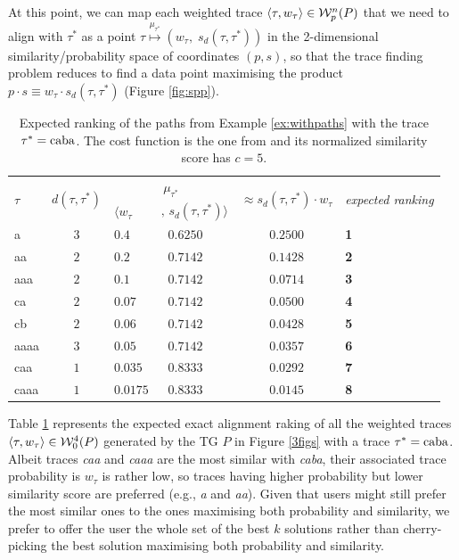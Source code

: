 At this point, we can map each weighted trace  $\braket{\tau,w_\tau}\in\mathcal{W}_p^n(P)$ that we need to align with $\tau^*$ as a point $\tau\overset{\mu_{\tau^*}}{\mapsto}(w_\tau,\; s_d(\tau,\tau^*))$ in the 2-dimensional similarity/probability space of coordinates $(p,s)$, so that the trace finding problem reduces to find a data point maximising the product $p\cdot s\equiv w_\tau\cdot s_d(\tau,\tau^*)$ (Figure \ref{fig:spp}).

\begin{table}[!t]
\centering
\caption{Expected ranking of the paths from Example \ref{ex:withpaths} with the trace $\tau^*=\textup{caba}$. The cost function is the one from \cite{LeoniM17} and its normalized similarity score has $c=5$.}\label{tab:expected}
\begin{tabular}{lc|ll|cl}
	\toprule
	
	\multirow{2}{*}{$\tau$} & 
	\multirow{2}{*}{$d(\tau,\tau^*)$} & 
	\multicolumn{2}{c|}{$\mu_{\tau^*}$} &
	 \multirow{2}{*}{$\approx s_d(\tau,\tau^*)\cdot w_\tau$} & \multirow{2}{*}{\textit{expected ranking}}\\
	 
	\cline{3-4} &&  $\langle w_\tau$ &  $,\,s_d(\tau,\tau^*)\rangle $ &&\\
	 
	\midrule
	{a}  & $3$ & $0.4$ & $\;\; 0.6250$  & $0.2500$ & \textbf{1}\\
	{aa}  & $2$ & $0.2$ & $\;\; 0.7142$ & $0.1428$ & \textbf{2}\\
	{aaa}  & $2$ & $0.1$ & $\;\; 0.7142$ & $0.0714$ & \textbf{3}\\
	{ca}  & $2$ & $0.07$ & $\;\; 0.7142$ & $0.0500$ & \textbf{4}\\
	{cb}  & $2$ & $0.06$ & $\;\; 0.7142$ & $0.0428$ & \textbf{5}\\
	{aaaa}  & $3$ & $0.05$ & $\;\; 0.7142$ & $0.0357$ & \textbf{6}\\
	{caa}  & $1$ & $0.035$ & $\;\; 0.8333$ & $0.0292$ &  \textbf{7}\\
	{caaa}  & $1$  & $0.0175$ & $\;\; 0.8333$ & $0.0145$ & \textbf{8}\\
	\bottomrule
\end{tabular}
\end{table}
\begin{example}\label{ex:rankingTaus}
Table \ref{tab:expected} represents the expected exact alignment raking of all the weighted traces $\braket{\tau,w_\tau}\in\mathcal{W}_0^4(P)$ generated by the TG $P$ in Figure \ref{3figs} with a trace $\tau^*=\textup{caba}$.  Albeit traces \textit{caa} and \textit{caaa} are the most similar with \textit{caba}, their associated trace probability is $w_\tau$ is rather low, so traces having higher probability but lower similarity score are preferred (e.g., \textit{a} and \textit{aa}). Given that users might still prefer the most similar ones to the ones maximising both probability and similarity, we prefer to offer the user the whole set of the best $k$ solutions rather than cherry-picking the best solution maximising both probability and similarity.
\end{example}

